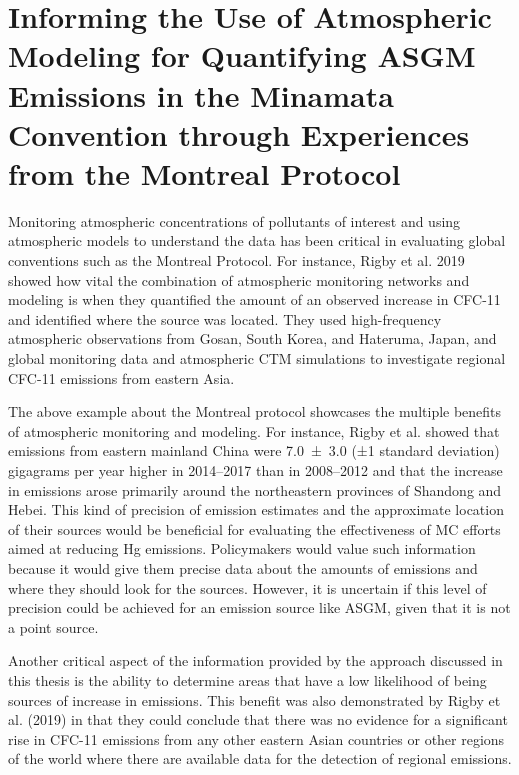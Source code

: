 \section{Informing the Use of Atmospheric Modeling for Quantifying ASGM Emissions in the Minamata Convention through Experiences from the Montreal Protocol} \label{motreal_protocol_comparison}

\begin{flushleft}
Monitoring atmospheric concentrations of pollutants of interest and using atmospheric models to understand the data has been critical in evaluating global conventions such as the Montreal Protocol. For instance, Rigby et al. 2019 showed how vital the combination of atmospheric monitoring networks and modeling is when they quantified the amount of an observed increase in CFC-11 and identified where the source was located\cite{rigby_increase_2019}. They used high-frequency atmospheric observations from Gosan, South Korea, and Hateruma, Japan, and global monitoring data and atmospheric CTM simulations to investigate regional CFC-11 emissions from eastern Asia.  
\end{flushleft}
\begin{flushleft}
    The above example about the Montreal protocol showcases the multiple benefits of atmospheric monitoring and modeling. For instance, Rigby et al.\cite{rigby_increase_2019}  showed that emissions from eastern mainland China were 7.0 ± 3.0 (±1 standard deviation) gigagrams per year higher in 2014–2017 than in 2008–2012 and that the increase in emissions arose primarily around the northeastern provinces of Shandong and Hebei\cite{rigby_increase_2019}. This kind of precision of emission estimates and the approximate location of their sources would be beneficial for evaluating the effectiveness of MC efforts aimed at reducing Hg emissions. Policymakers would value such information because it would give them precise data about the amounts of emissions and where they should look for the sources. However, it is uncertain if this level of precision could be achieved for an emission source like ASGM, given that it is not a point source.
    
    Another critical aspect of the information provided by the approach discussed in this thesis is the ability to determine areas that have a low likelihood of being sources of increase in emissions. This benefit was also demonstrated  by Rigby et al. (2019)  in that they could conclude that there was no evidence for a significant rise in CFC-11 emissions from any other eastern Asian countries or other regions of the world where there are available data for the detection of regional emissions.
\end{flushleft}

